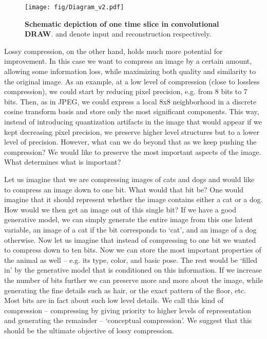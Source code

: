 \documentclass{article}
\begin{document}
\begin{figure}[t]
\vspace{-.0cm}
\begin{center}
\begin{minipage}{0.5\textwidth}
\texttt{[image: fig/Diagram\_v2.pdf]}
\caption{\textbf{Schematic depiction of one time slice in convolutional DRAW}.  and  denote input and reconstruction respectively.
}
\vspace{-.5cm}
\label{diagram}
\end{minipage}
\end{center}
\end{figure}

Lossy compression, on the other hand, holds much more potential for improvement. In this case we want to compress an image by a certain amount, allowing some information loss, while maximizing both quality and similarity to the original image. As an example, at a low level of compression (close to lossless compression), we could start by reducing pixel precision, e.g. from 8 bits to 7 bits. Then, as in JPEG, we could express a local 8x8 neighborhood in a discrete cosine transform basis and store only the most significant components. This way, instead of introducing quantization artifacts in the image that would appear if we kept decreasing pixel precision, we preserve higher level structures but to a lower level of precision. However, what can we do beyond that as we keep pushing the compression? We would like to preserve the most important aspects of the image. What determines what is important?





Let us imagine that we are compressing images of cats and dogs and would like to compress an image down to one bit. What would that bit be? One would imagine that it should represent whether the image contains either a cat or a dog. How would we then get an image out of this single bit? If we have a good generative model, we can simply generate the entire image from this one latent variable, an image of a cat if the bit corresponds to `cat', and an image of a dog otherwise. Now let us imagine that instead of compressing to one bit we wanted to compress down to ten bits. Now we can store the most important properties of the animal as well -- e.g. its type, color, and basic pose. The rest would be `filled in' by the generative model that is conditioned on this information. If we increase the number of bits further we can preserve more and more about the image, while generating the fine details such as hair, or the exact pattern of the floor, etc. Most bits are in fact about such low level details. We call this kind of compression -- compressing by giving priority to higher levels of representation and generating the remainder -- `conceptual compression'. We suggest that this should be the ultimate objective of lossy compression. 
\end{document}
